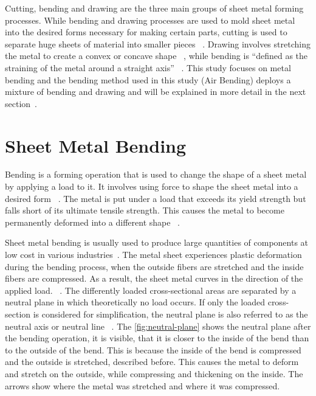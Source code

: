 Cutting, bending and drawing are the three main groups of sheet metal forming processes.
While bending and drawing processes are used to mold sheet metal into the desired forms necessary for making certain
parts, cutting is used to separate huge sheets of material into smaller pieces
~\cite[p. 405]{groover2020fundamentals}.
Drawing involves stretching the metal to create a convex or concave shape
~\cite[p. 416]{groover2020fundamentals}, while bending is ``defined as the straining of the
metal around a straight axis''
~\cite[p. 412]{groover2020fundamentals}.
This study focuses on metal bending and the bending method used in this study (Air Bending) deploys a mixture of
bending and drawing and will be explained in more detail in the next
section~\cite[pp. 416]{groover2020fundamentals}.


\section{Sheet Metal Bending}\label{sec:bending}
Bending is a forming operation that is used to change the shape of a sheet metal by
applying a load to it.
It involves using force to shape the sheet metal into a desired form
~\cite[p. 1]{dib2020single}.
The metal is put under a load that exceeds its yield strength but falls short of its ultimate tensile strength.
This causes the metal to become permanently deformed into a different shape
~\cite[pp. 1--2]{baig2021machine}.

Sheet metal bending is usually used to produce large quantities of components at low cost in various
industries~\cite[p. 1]{dib2020single}.
The metal sheet experiences plastic deformation during the bending process, when the outside fibers are stretched and
the inside fibers are compressed.
As a result, the sheet metal curves in the direction of the applied load.
~\cite[pp. 1--3]{baig2021machine}.
The differently loaded cross-sectional areas are separated by a neutral plane in which theoretically no load occurs.
If only the loaded cross-section is considered for simplification, the neutral plane is also referred to as the
neutral axis or neutral line
~\cite[pp. 67]{gustafson1998analytical}.
The \cref{fig:neutral-plane} shows the neutral plane after the bending operation, it is
visible, that it is closer to the inside of the bend than to the outside of the bend.
This is because the inside of the bend is compressed and the outside is stretched, described before.
This causes the metal to deform and stretch on the outside, while compressing and thickening on the inside.
The arrows show where the metal was stretched and where it was compressed.

